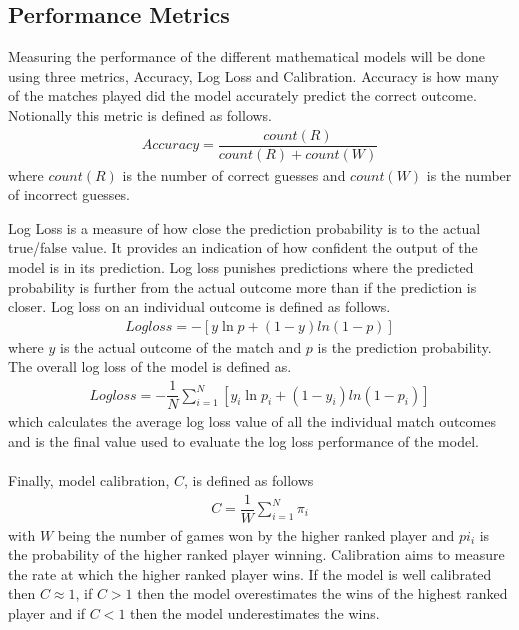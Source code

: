 \documentclass[12pt,a4paper]{article}
\begin{document}
\subsection{Performance Metrics}
Measuring the performance of the different mathematical models will be done using
three metrics, Accuracy, Log Loss and Calibration. Accuracy is how many of the matches played
did the model accurately predict the correct outcome. Notionally this metric is
defined as follows.
\begin{gather}
  Accuracy = \dfrac{count(R)}{count(R)+count(W)}
\end{gather}
where $count(R)$ is the number of correct guesses and $count(W)$ is the number
of incorrect guesses.

Log Loss is a measure of how close the prediction probability is to the actual
true/false value. It provides an indication of how confident the output of the
model is in its prediction. Log loss punishes predictions where the predicted
probability is further from the actual outcome more than if the prediction is
closer. Log loss on an individual outcome is defined as follows.
\begin{gather}
  Logloss = -[y \ln p +(1-y)ln(1-p)]
\end{gather}
where $y$ is the actual outcome of the match and $p$ is the prediction probability.
The overall log loss of the model is defined as.
\begin{gather}
  Logloss = -\dfrac{1}{N}\sum_{i=1}^{N}[y_i \ln p_i +(1-y_i)ln(1-p_i)]
\end{gather}
which calculates the average log loss value of all the individual match outcomes
and is the final value used to evaluate the log loss performance of the model.
\\
\\
Finally, model calibration, $C$, is defined as follows
\begin{gather}
  C = \dfrac{1}{W}\sum_{i=1}^{N}\pi_i
\end{gather}
with $W$ being the number of games won by the higher ranked player and $pi_i$ is the
probability of the higher ranked player winning. Calibration aims to measure the rate
at which the higher ranked player wins. If the model is well calibrated then $C \approx 1$,
if $C > 1$ then the model overestimates the wins of the highest ranked player and if
$C < 1$ then the model underestimates the wins.

\clearpage
\end{document}
